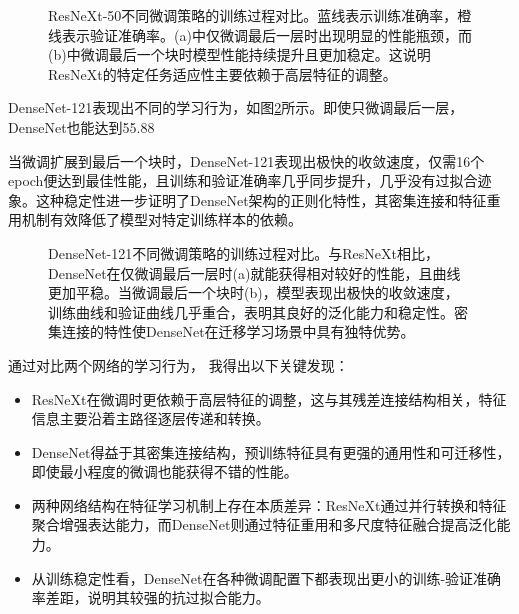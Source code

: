 \documentclass[a4paper,10pt,twocolumn]{article}
\makeatletter
\let\@oldlabel\label
\renewcommand{\label}[1]{\@oldlabel{#1}}
\makeatother
\begin{document}
\begin{figure}[H]
\centering
{}
\caption{ResNeXt-50不同微调策略的训练过程对比。蓝线表示训练准确率，橙线表示验证准确率。(a)中仅微调最后一层时出现明显的性能瓶颈，而(b)中微调最后一个块时模型性能持续提升且更加稳定。这说明ResNeXt的特定任务适应性主要依赖于高层特征的调整。}
\label{fig:feature_visualization_resnext}
\end{figure}

DenseNet-121表现出不同的学习行为，如图\ref{fig:feature_visualization_densenet}所示。即使只微调最后一层，DenseNet也能达到55.88%

当微调扩展到最后一个块时，DenseNet-121表现出极快的收敛速度，仅需16个epoch便达到最佳性能，且训练和验证准确率几乎同步提升，几乎没有过拟合迹象。这种稳定性进一步证明了DenseNet架构的正则化特性，其密集连接和特征重用机制有效降低了模型对特定训练样本的依赖。

\begin{figure}[H]
\centering
{}
\caption{DenseNet-121不同微调策略的训练过程对比。与ResNeXt相比，DenseNet在仅微调最后一层时(a)就能获得相对较好的性能，且曲线更加平稳。当微调最后一个块时(b)，模型表现出极快的收敛速度，训练曲线和验证曲线几乎重合，表明其良好的泛化能力和稳定性。密集连接的特性使DenseNet在迁移学习场景中具有独特优势。}
\label{fig:feature_visualization_densenet}
\end{figure}

通过对比两个网络的学习行为， 我得出以下关键发现：

\begin{itemize}
    \item ResNeXt在微调时更依赖于高层特征的调整，这与其残差连接结构相关，特征信息主要沿着主路径逐层传递和转换。
    \item DenseNet得益于其密集连接结构，预训练特征具有更强的通用性和可迁移性，即使最小程度的微调也能获得不错的性能。
    \item 两种网络结构在特征学习机制上存在本质差异：ResNeXt通过并行转换和特征聚合增强表达能力，而DenseNet则通过特征重用和多尺度特征融合提高泛化能力。
    \item 从训练稳定性看，DenseNet在各种微调配置下都表现出更小的训练-验证准确率差距，说明其较强的抗过拟合能力。
\end{itemize}
\end{document}
